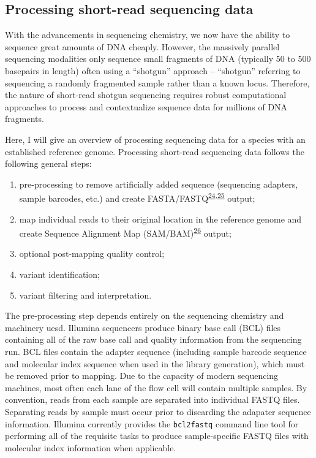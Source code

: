 \documentclass[11pt,letterpaper]{book}
\begin{document}
\hypertarget{processing-short-read-sequencing-data}{%
\subsection{Processing short-read sequencing data}\label{processing-short-read-sequencing-data}}

With the advancements in sequencing chemistry, we now have the ability to sequence great amounts of DNA cheaply.
However, the massively parallel sequencing modalities only sequence small fragments of DNA (typically 50 to 500 basepairs in length) often using a ``shotgun'' approach -- ``shotgun'' referring to sequencing a randomly fragmented sample rather than a known locus.
Therefore, the nature of short-read shotgun sequencing requires robust computational approaches to process and contextualize sequence data for millions of DNA fragments.

Here, I will give an overview of processing sequencing data for a species with an established reference genome.
Processing short-read sequencing data follows the following general steps:

\begin{enumerate}
\def\labelenumi{\arabic{enumi}.}
\item
  pre-processing to remove artificially added sequence (sequencing adapters, sample barcodes, etc.) and create FASTA/FASTQ\textsuperscript{\protect\hyperlink{ref-pearson:1988aa}{24},\protect\hyperlink{ref-cock:2010aa}{25}} output;
\item
  map individual reads to their original location in the reference genome and create Sequence Alignment Map (SAM/BAM)\textsuperscript{\protect\hyperlink{ref-li:2009aa}{26}} output;
\item
  optional post-mapping quality control;
\item
  variant identification;
\item
  variant filtering and interpretation.
\end{enumerate}

The pre-processing step depends entirely on the sequencing chemistry and machinery uesd.
Illumina sequencers produce binary base call (BCL) files containing all of the raw base call and quality information from the sequencing run.
BCL files contain the adapter sequence (including sample barcode sequence and molecular index sequence when used in the library generation), which must be removed prior to mapping.
Due to the capacity of modern sequencing machines, most often each lane of the flow cell will contain multiple samples.
By convention, reads from each sample are separated into individual FASTQ files.
Separating reads by sample must occur prior to discarding the adapater sequence information.
Illumina currently provides the \texttt{bcl2fastq} command line tool for performing all of the requisite tasks to produce sample-specific FASTQ files with molecular index information when applicable.
\end{document}
